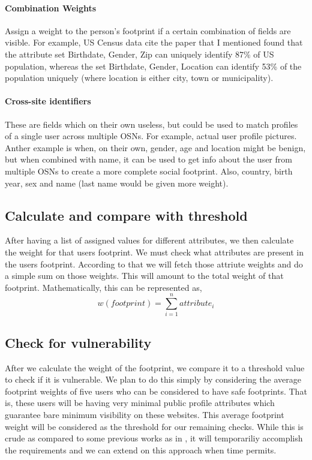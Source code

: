 \documentclass[12pt,conference]{IEEEtran}
\begin{document}
\paragraph*{Combination Weights}  Assign a weight to the person’s footprint if a certain combination of fields are visible. For example, US Census data {cite the paper that I mentioned} found that the attribute set {Birthdate, Gender, Zip} can uniquely identify 87\% of US population, whereas the set {Birthdate, Gender, Location} can identify 53\% of the population uniquely (where location is either city, town or municipality).
\paragraph*{Cross-site identifiers}  These are fields which on their own useless, but could be used to match profiles of a single user across multiple OSNs. For example, actual user profile pictures. Anther example is when, on their own, gender, age and location might be benign, but when combined with name, it can be used to get info about the user from multiple OSNs to create a more complete social footprint. Also, country, birth year, sex and name (last name would be given more weight).

\subsection{Calculate and compare with threshold}
After having a list of assigned values for different attributes, we then calculate the weight for that users footprint. We must check what attributes are present in the users footprint. According to that we will fetch those attriute weights and do a simple sum on those weights. This will amount to the total weight of that footprint.
Mathematically, this can be represented as,
\begin{equation}
w(footprint) = \sum_{i=1}^{n}attribute_i
\end{equation}
\subsection{Check for vulnerability}
After we calculate the weight of the footprint, we compare it to a threshold value to check if it is vulnerable. We plan to do this simply by considering the average footprint weights of five users who can be considered to have safe footprints. That is, these users will be having very minimal public profile attributes which guarantee bare minimum visibility on these websites. This average footprint weight will be considered as the threshold for our remaining checks. While this is crude as compared to some previous works as in \cite{pidx}, it will temporariliy accomplish the requirements and we can extend on this approach when time permits.
\end{document}
